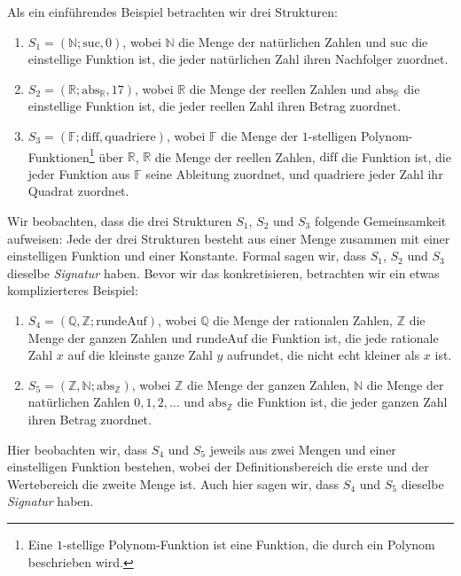 \documentclass{article}
\begin{document}
Als ein einführendes Beispiel betrachten wir drei Strukturen: 
\begin{enumerate}
 \item $S_1 = (\mathds{N};\mathrm{suc},0)$, wobei $\mathds{N}$ die Menge der 
natürlichen Zahlen und $\mathrm{suc}$ die einstellige Funktion ist, die jeder 
natürlichen Zahl ihren Nachfolger zuordnet. 
 \item $S_2 = (\mathds{R};\mathrm{abs}_{\mathds{R}},17)$, wobei $\mathds{R}$ 
die Menge der reellen Zahlen und $\mathrm{abs}_{\mathds{R}}$ die einstellige 
Funktion ist, die jeder reellen Zahl ihren Betrag zuordnet. 
  \item $S_3 = (\mathds{F}; \mathrm{diff}, \mathrm{quadriere})$, wobei 
$\mathds{F}$ die Menge der $1$-stelligen Polynom-Funktionen\footnote{Eine 
$1$-stellige Polynom-Funktion ist eine Funktion, die durch ein Polynom 
beschrieben wird.} über $\mathds{R}$, $\mathds{R}$ 
die Menge der reellen Zahlen, $\mathrm{diff}$ die Funktion ist, die jeder 
Funktion aus $\mathds{F}$ seine Ableitung zuordnet, und $\mathrm{quadriere}$ 
jeder Zahl ihr Quadrat zuordnet. 
\end{enumerate}
Wir beobachten, dass die drei Strukturen $S_1$, $S_2$ und $S_3$ folgende 
Gemeinsamkeit aufweisen: Jede der drei Strukturen besteht aus einer Menge 
zusammen mit einer einstelligen Funktion und einer Konstante. Formal sagen wir, 
dass $S_1$, $S_2$ und $S_3$ dieselbe \emph{Signatur} haben. Bevor wir das 
konkretisieren, 
betrachten wir 
ein etwas komplizierteres Beispiel: 
\begin{enumerate}
 \item $S_4 = (\mathds{Q},\mathds{Z};\mathrm{rundeAuf})$, wobei $\mathds{Q}$ 
die Menge der rationalen Zahlen, $\mathds{Z}$ die Menge der ganzen Zahlen und 
$\mathrm{rundeAuf}$ die Funktion ist, die jede rationale Zahl $x$ auf die 
kleinste ganze Zahl $y$ aufrundet, die nicht echt kleiner als $x$ ist. 
 \item $S_5 = (\mathds{Z},\mathds{N};\mathrm{abs}_{\mathds{Z}})$, wobei 
$\mathds{Z}$ die Menge der ganzen Zahlen, $\mathds{N}$ die Menge der 
natürlichen Zahlen $0,1,2,\ldots$ und $\mathrm{abs}_{\mathds{Z}}$ die Funktion 
ist, die jeder ganzen Zahl ihren Betrag zuordnet. 
\end{enumerate}
Hier beobachten wir, dass $S_4$ und $S_5$ jeweils aus zwei Mengen und 
einer einstelligen Funktion bestehen, wobei der Definitionsbereich die erste 
und der Wertebereich die zweite Menge ist. Auch hier sagen wir, dass $S_4$ und 
$S_5$ dieselbe \emph{Signatur} haben. 
\end{document}
